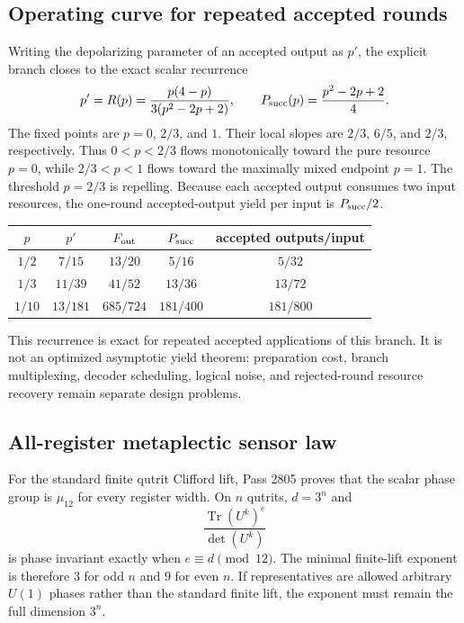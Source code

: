 \subsection{Operating curve for repeated accepted rounds}
Writing the depolarizing parameter of an accepted output as $p'$, the explicit branch
closes to the exact scalar recurrence
\[
 p'=R(p)=\frac{p(4-p)}{3(p^2-2p+2)},
 \qquad
 P_{\rm succ}(p)=\frac{p^2-2p+2}{4}.
\]
The fixed points are $p=0$, $2/3$, and $1$. Their local slopes are $2/3$, $6/5$, and
$2/3$, respectively. Thus $0<p<2/3$ flows monotonically toward the pure resource
$p=0$, while $2/3<p<1$ flows toward the maximally mixed endpoint $p=1$. The threshold
$p=2/3$ is repelling. Because each accepted output consumes two input resources, the
one-round accepted-output yield per input is $P_{\rm succ}/2$.

\begin{center}
\begin{tabular}{@{}ccccc@{}}
\toprule
$p$ & $p'$ & $F_{\rm out}$ & $P_{\rm succ}$ & accepted outputs/input\\
\midrule
$1/2$ & $7/15$ & $13/20$ & $5/16$ & $5/32$\\
$1/3$ & $11/39$ & $41/52$ & $13/36$ & $13/72$\\
$1/10$ & $13/181$ & $685/724$ & $181/400$ & $181/800$\\
\bottomrule
\end{tabular}
\end{center}

This recurrence is exact for repeated accepted applications of this branch. It is not an
optimized asymptotic yield theorem: preparation cost, branch multiplexing, decoder
scheduling, logical noise, and rejected-round resource recovery remain separate design
problems.

\subsection{All-register metaplectic sensor law}
For the standard finite qutrit Clifford lift, Pass 2805 proves that the scalar phase group
is $\mu_{12}$ for every register width. On $n$ qutrits, $d=3^n$ and
\[
 \frac{\operatorname{Tr}(U^k)^e}{\det(U^k)}
\]
is phase invariant exactly when $e\equiv d\pmod{12}$. The minimal finite-lift exponent is
therefore $3$ for odd $n$ and $9$ for even $n$. If representatives are allowed arbitrary
$U(1)$ phases rather than the standard finite lift, the exponent must remain the full
dimension $3^n$.


